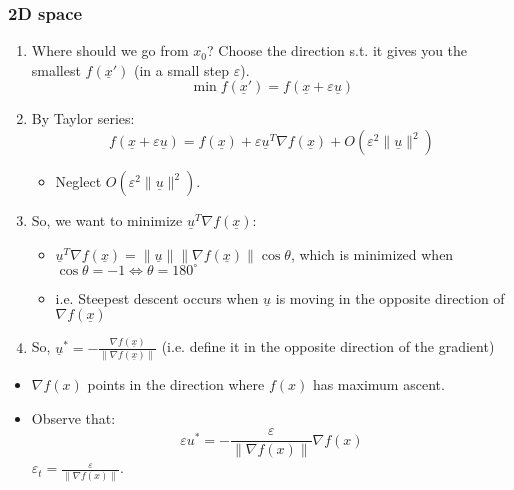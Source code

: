     \subsubsection{2D space}
    \begin{intuition}
        \begin{enumerate}
            \item Where should we go from \( x_0 \)? Choose the direction s.t. it gives you the smallest \( f(\underline{x}') \) (in a small step \( \varepsilon \)).
            \[
            \min f(\underline{x}') = f(\underline{x} + \varepsilon  \underline{u} )
            \]

        
            \item By Taylor series:
            \[
            f(\underline{x} + \varepsilon \underline{u}) = f(\underline{x}) + \varepsilon \underline{u}^T \nabla f(\underline{x}) + O(\varepsilon^2 \|\underline{u}\|^2)
            \]
            \begin{itemize}
                \item Neglect $O(\varepsilon^2 \|\underline{u}\|^2)$.
            \end{itemize}
        
            \item So, we want to minimize \( \underline{u}^T \nabla f(\underline{x}) \):
            \begin{itemize}
                \item \( \underline{u}^T \nabla f(\underline{x}) = \|\underline{u}\| \| \nabla f(\underline{x})\| \cos \theta \), which is minimized when \( \cos \theta = -1 \Longleftrightarrow \theta = 180^\circ \)
                \item i.e. Steepest descent occurs when $\underline{u}$ is moving in the opposite direction of $\nabla f(\underline{x})$ 
            \end{itemize}
            
            \item So, \( \underline{u}^* = -\frac{\nabla f(\underline{x})}{\|\nabla f(\underline{x})\|} \) (i.e. define it in the opposite direction of the gradient)
        \end{enumerate}
        \vspace{1em}

        \begin{itemize}
            \item \( \nabla f(x) \) points in the direction where \( f(x) \) has maximum ascent.
        
            \item Observe that:
            \[
            \varepsilon u^* = -\frac{\varepsilon}{\|\nabla f(x)\|} \nabla f(x)
            \]
            \( \varepsilon_t = \frac{\varepsilon}{\|\nabla f(x)\|} \).
        \end{itemize}

    \end{intuition}

